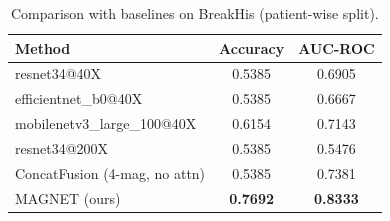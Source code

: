 \begin{table}[h]\centering
\caption{Comparison with baselines on BreakHis (patient-wise split).}
\begin{tabular}{lcc}\hline
Method & Accuracy & AUC-ROC \\\hline
resnet34@40X & 0.5385 & 0.6905 \\
efficientnet_b0@40X & 0.5385 & 0.6667 \\
mobilenetv3_large_100@40X & 0.6154 & 0.7143 \\
resnet34@200X & 0.5385 & 0.5476 \\
ConcatFusion (4-mag, no attn) & 0.5385 & 0.7381 \\
MAGNET (ours) & \textbf{0.7692} & \textbf{0.8333} \\
\hline\end{tabular}\label{tab:baselines}\end{table}